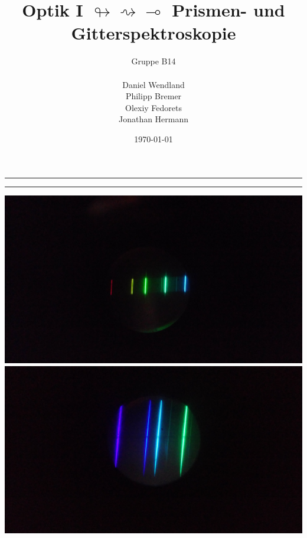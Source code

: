 \documentclass[a4paper, 11pt]{article}
\title{Optik I $\looparrowright\rightsquigarrow\multimap$ Prismen- und Gitterspektroskopie}
\author{Gruppe B14 \\ \\ Daniel Wendland \\ Philipp Bremer \\ Olexiy Fedorets \\ Jonathan Hermann}
\date{\today}
\begin{document}
\begin{titlepage}
	\vspace*{\fill}
	\begin{center}
		\textheight
		\vfill
		\newcommand{\Line}{\rule{\linewidth}{0.6mm}}
		\Line 
		{\let\newpage\relax\maketitle}
		\Line 
		\vfill
	\end{center}
	
	
	\begin{center}
		\includegraphics[trim={1cm 1cm 1cm 1cm},clip=true,scale=0.08]{Bilder/IMG_20170915_131423.jpg}  
		\textwidth
		\includegraphics[trim={1cm 1cm 1cm 1cm},clip=true,scale=0.08]{Bilder/IMG_20170915_131047.jpg}  
	\end{center}
	
	\vspace*{\fill}
	\thispagestyle{empty}
\end{titlepage}
\end{document}
